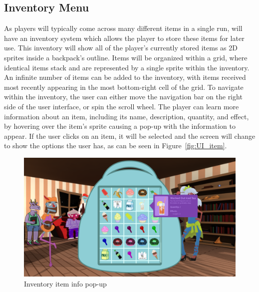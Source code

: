 \subsection{Inventory Menu}
\label{sec:inventory}
As players will typically come across many different items in a single run, \ourgame{} will have an inventory system which allows the player to store these items for later use. This inventory will show all of the player's currently stored items as 2D sprites inside a backpack's outline. Items will be organized within a grid, where identical items stack and are represented by a single sprite within the inventory. An infinite number of items can be added to the inventory, with items received most recently appearing in the most bottom-right cell of the grid. To navigate within the inventory, the user can either move the navigation bar on the right side of the user interface, or spin the scroll wheel. The player can learn more information about an item, including its name, description, quantity, and effect, by hovering over the item's sprite causing a pop-up with the information to appear. If the user clicks on an item, it will be selected and the screen will change to show the options the user has, as can be seen in Figure~\ref{fig:UI_item}.

\begin{figure}[htb]
\centering
\includegraphics[width=.6\linewidth]{images/grid_Hovered}
\caption{Inventory item info pop-up}
\label{fig:inventory_grid_hovered}
\end{figure}
